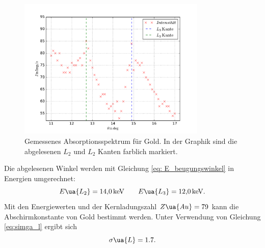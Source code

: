 \begin{figure}
  \centering
  \includegraphics[width=0.8\textwidth]{../Messdaten/gold.pdf}
  \caption{Gemessenes Absorptionsspektrum für Gold. In der Graphik sind die abgelesenen $L_2$ und $L_2$ Kanten farblich markiert.} %
  \label{fig: absotp_gold}
\end{figure}
Die abgelesenen Winkel werden mit Gleichung \eqref{eq: E_beugungswinkel} in Energien umgerechnet:
\begin{equation}
  \label{eq:l_kanten_gold}
  E\ua{L_2}=\SI{14.0}{\kilo\eV}  \qquad   E\ua{L_3}=\SI{12.0}{\kilo\eV}.
\end{equation}
Mit den Energiewerten und der Kernladungszahl $Z\ua{Au}=79$ kann die Abschirmkonstante
von Gold bestimmt werden. Unter Verwendung von Gleichung \eqref{eq:simga_l} ergibt sich
\begin{equation*}
    \sigma\ua{L}=1.7.
\end{equation*}

\FloatBarrier
\FloatBarrier
